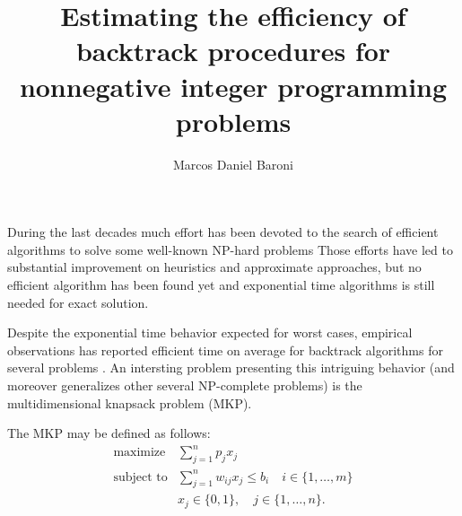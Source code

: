 \documentclass{article}
\title{Estimating the efficiency of backtrack procedures for nonnegative integer programming problems}
\author{Marcos Daniel Baroni}
\begin{document}
\maketitle




During the last decades much effort has been devoted to the search of
efficient algorithms to solve some well-known NP-hard problems
Those efforts have led to substantial improvement on heuristics and
approximate approaches, but no efficient algorithm has been found yet and
exponential time algorithms is still needed for exact solution.

Despite the exponential time behavior expected for worst cases, empirical
observations has reported efficient time on average for backtrack algorithms for
several problems \cite{cheeseman1991really, wilf1984backtrack,
posa1976hamiltonian, johnson1984np11, purdom1983search}.
An intersting problem presenting this intriguing behavior (and moreover
generalizes other several NP-complete problems) is the multidimensional knapsack
problem (MKP).

The MKP may be defined as follows:
\begin{align*}
  \text{maximize} & \sum_{j=1}^n p_j x_j \\
  \text{subject to} & \sum_{j=1}^n w_{ij} x_j \leq b_i \quad i \in \{1, \ldots, m\}\\
   & x_j \in \{0, 1\}, \quad j \in \{1, \ldots, n\}.
\end{align*}
\end{document}
